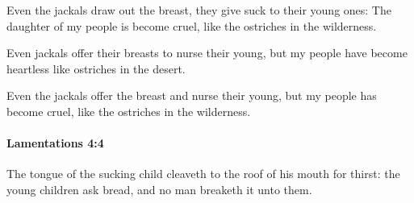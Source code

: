 			\begin{versebox}
					\item[BHS] 
					\item[LXX] 
					\item[ASV] Even the jackals draw out the breast, they give suck to their young ones: The daughter of my people is become cruel, like the ostriches in the wilderness.
					\item[NIV] Even jackals offer their breasts to nurse their young, but my people have become heartless like ostriches in the desert.
					\item[NRSV] Even the jackals offer the breast and nurse their young, but my people has become cruel, like the ostriches in the wilderness.
			\end{versebox}

		\paragraph{Lamentations 4:4} %
			\label{LAMENTATIONS-4-4}

			The tongue of the sucking child cleaveth to the roof of his mouth for thirst: the young children ask bread, and no man breaketh it unto them.

